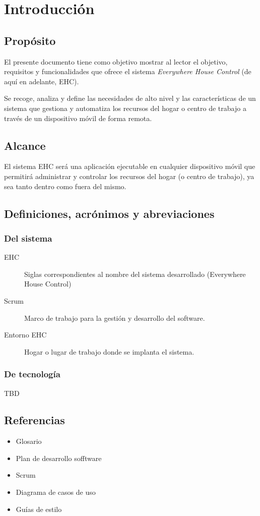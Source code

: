 \chapter{Introducción}

\section{Propósito}
    El presente documento tiene como objetivo mostrar al lector el objetivo, requisitos y funcionalidades que ofrece el sistema \textit{Everywhere House Control} (de aquí en adelante, EHC). \par
    Se recoge, analiza y define las necesidades de alto nivel y las características de un sistema que gestiona y automatiza los recursos del hogar o centro de trabajo a través de un dispositivo móvil de forma remota.

\section{Alcance}
    El sistema EHC será una aplicación ejecutable en cualquier dispositivo móvil que permitirá administrar y controlar los recursos del hogar (o centro de trabajo), ya sea tanto dentro como fuera del mismo.

\section{Definiciones, acrónimos y abreviaciones}
    \subsection{Del sistema}
        \begin{description}
            \item[EHC] Siglas correspondientes al nombre del sistema desarrollado (Everywhere House Control)
            \item[Scrum] Marco de trabajo para la gestión y desarrollo del software.
            \item[Entorno EHC] Hogar o lugar de trabajo donde se implanta el sistema.
        \end{description}
    \subsection{De tecnología}
    TBD

\section{Referencias}
    \begin{itemize}
        \item Glosario
        \item Plan de desarrollo sofftware
        \item Scrum
        \item Diagrama de casos de uso
        \item Guías de estilo
    \end{itemize}
